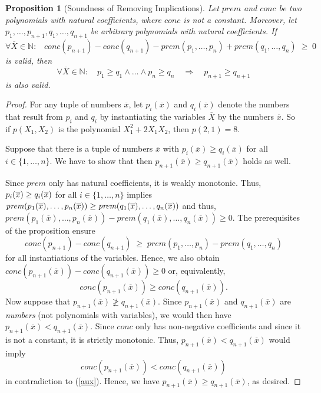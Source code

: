 \documentclass[envcountsame]{tlp}
\newtheorem{proposition}{Proposition}
\begin{document}
\begin{proposition}[Soundness of Removing Implications]\label{Soundness of First Phase of the Transformation} 
Let $\mathit{prem}$ and $\mathit{conc}$ be two polynomials with
natural coefficients, where $\mathit{conc}$ is not a constant.
Moreover, let $p_1,\ldots,p_{n+1},q_1,\ldots,q_{n+1}$ be
arbitrary polynomials with  natural coefficients.
If
\[  \forall \overline{X} \in \mathbb{N}: \;\;\; \mathit{conc}(p_{n+1}) -
\mathit{conc}(q_{n+1}) -  \mathit{prem}(p_1,\ldots,p_n) +
\mathit{prem}(q_1,\ldots,q_n) \; \geq  \; 0\]
is valid, then
\[
   \forall \overline{X} \in \mathbb{N}: \quad p_1 \ge q_1 \wedge \ldots \wedge
p_n \ge q_n \quad \Rightarrow \quad p_{n+1} \ge q_{n+1}
\]
is also valid.
\end{proposition}
\begin{proof}
For any tuple of
numbers $\overline{x}$, let
$p_i(\overline{x})$ and $q_i(\overline{x})$
denote the numbers that result from $p_i$ and $q_i$ by instantiating the
variables $\overline{X}$ by the numbers $\overline{x}$. So if $p(X_1,X_2)$ is the
polynomial $X_1^2 + 2 X_1 X_2$,
then $p(2,1) = 8$. 

Suppose that there is a tuple of numbers 
$\overline{x}$ with
$p_i(\overline{x}) \ge q_i(\overline{x})$
for all $i \in \{1, \ldots, n\}$. We have to show that then
$p_{n+1}(\overline{x}) \ge q_{n+1}(\overline{x})$ holds as well.

Since $\mathit{prem}$ only has natural coefficients, it is weakly monotonic.
Thus,
$p_i(\overline{x})\linebreak \ge q_i(\overline{x})$ for all $i \in \{1, \ldots, n\}$
implies
$\mathit{prem}(p_1(\overline{x}),\ldots,p_n(\overline{x})) \ge
\mathit{prem}(q_1(\overline{x}),\linebreak \ldots,q_n(\overline{x}))$ and thus,
$\mathit{prem}(p_1(\overline{x}),\ldots,p_n(\overline{x})) -
\mathit{prem}(q_1(\overline{x}),\ldots,q_n(\overline{x})) \ge 0$.
The prerequisites of the proposition ensure 
\[ \mathit{conc}(p_{n+1}) -
\mathit{conc}(q_{n+1}) \; \ge \; \mathit{prem}(p_1,\ldots,p_n) -
\mathit{prem}(q_1,\ldots,q_n)\]
for all instantiations of the variables. Hence, we also obtain
\linebreak
$\mathit{conc}(p_{n+1}(\overline{x})) -
\mathit{conc}(q_{n+1}(\overline{x})) \ge 0$ or, equivalently,
\begin{equation}
\label{aux} \mathit{conc}(p_{n+1}(\overline{x})) \ge
\mathit{conc}(q_{n+1}(\overline{x})).
\end{equation}
Now suppose that $p_{n+1}(\overline{x}) \not\ge q_{n+1}(\overline{x})$. Since 
$p_{n+1}(\overline{x})$ and $q_{n+1}(\overline{x})$ are \emph{numbers} (not
polynomials with variables), we would then have $p_{n+1}(\overline{x}) <
q_{n+1}(\overline{x})$. Since 
 $\mathit{conc}$ only has non-negative coefficients and since it is not a
constant, it is strictly monotonic. Thus,  $p_{n+1}(\overline{x}) <
q_{n+1}(\overline{x})$ would imply 
\[ \mathit{conc}(p_{n+1}(\overline{x})) <
\mathit{conc}(q_{n+1}(\overline{x}))\]
in contradiction to (\ref{aux}). Hence, we have $p_{n+1}(\overline{x}) \ge
q_{n+1}(\overline{x})$, as desired. 

\end{proof}
\end{document}
